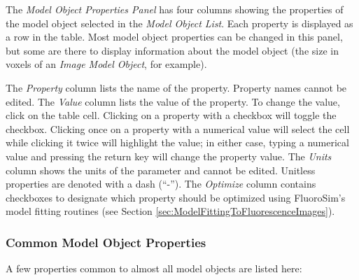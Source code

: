 \documentclass[11pt,titlepage]{article}
\begin{document}
The \emph{Model Object Properties Panel} has four columns showing the properties of the model object selected in the \emph{Model Object List}. Each property is displayed as a row in the table. Most model object properties can be changed in this panel, but some are there to display information about the model object (the size in voxels of an \emph{Image Model Object}, for example).

The \emph{Property} column lists the name of the property. Property names cannot be edited. The \emph{Value} column lists the value of the property. To change the value, click on the table cell. Clicking on a property with a checkbox will toggle the checkbox. Clicking once on a property with a numerical value will select the cell while clicking it twice will highlight the value; in either case, typing a numerical value and pressing the return key will change the property value. The \emph{Units} column shows the units of the parameter and cannot be edited. Unitless properties are denoted with a dash (``-''). The \emph{Optimize} column contains checkboxes to designate which property should be optimized using FluoroSim's model fitting routines (see Section \ref{sec:ModelFittingToFluorescenceImages}).

\subsubsection{Common Model Object Properties}

A few properties common to almost all model objects are listed here:
\end{document}
